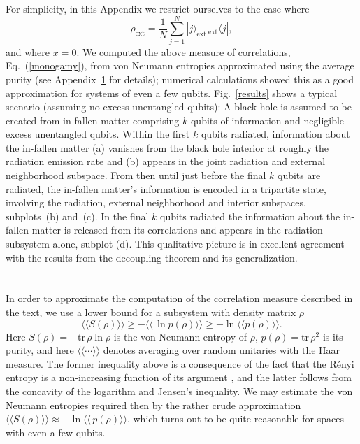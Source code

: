 \documentclass[aps,prl,amsmath,amssymb,floatfix,12pt]{revtex4}
\begin{document}
For simplicity, in this Appendix we restrict ourselves to the case
where
\begin{equation}
\rho_{\text{ext}}=\frac{1}{N}\sum_{j=1}^N
 |j\rangle_{\text{ext}}\,{}_{\text{ext}}\!\langle j|,
\end{equation}
and where $x=0$. We computed the above measure of correlations,
Eq.~(\ref{monogamy}), from von Neumann entropies approximated using the
average purity (see Appendix~\ref{purities} for details); numerical
calculations showed this as a good approximation for systems of even a
few qubits. Fig.~\ref{results} shows a typical scenario (assuming no
excess unentangled qubits): A black hole is assumed to be
created from in-fallen matter comprising $k$ qubits of information and
negligible excess unentangled qubits. Within the first $k$ qubits
radiated, information about the in-fallen matter (a) vanishes from the
black hole interior at roughly the radiation emission rate and (b) appears
in the joint radiation and external neighborhood subspace. From then
until just before the final $k$ qubits are radiated, the in-fallen
matter's information is encoded in a tripartite state, involving the
radiation, external neighborhood and interior subspaces, subplots~(b)
and~(c). In the final $k$ qubits radiated the information about the
in-fallen matter is released from its correlations and appears in the
radiation subsystem alone, subplot (d). This qualitative picture is
in excellent agreement with the results from the decoupling
theorem and its generalization.

\section{}
\label{purities}

In order to approximate the computation of the correlation measure
described in the text, we use a lower bound for a subsystem with
density matrix $\rho$
\begin{equation}
\langle\!\langle S(\rho) \rangle\!\rangle
\ge -\langle\!\langle \,\ln p(\rho) \rangle\!\rangle
\ge -\ln \langle\!\langle p(\rho) \rangle\!\rangle. %
\end{equation}
Here $S(\rho)=-{\text{tr}}\, \rho \ln \rho$ is the von Neumann entropy
of $\rho$, $p(\rho)= {\text{tr}}\, \rho^2$ is its purity, and here
$\langle\!\langle \cdots \rangle\!\rangle$ denotes averaging over
random unitaries with the Haar measure. The former inequality above is
a consequence of the fact that the R\'enyi entropy is a non-increasing
function of its argument \cite{Bengtsson06}, and the latter follows from the
concavity of the logarithm and Jensen's inequality. We may estimate
the von Neumann entropies required then by the rather crude
approximation
$\langle\!\langle S(\rho) \rangle\!\rangle
\approx -\ln \langle\!\langle \,p(\rho) \rangle\!\rangle$, 
which turns out to be quite reasonable for spaces with even a few qubits.
\end{document}
